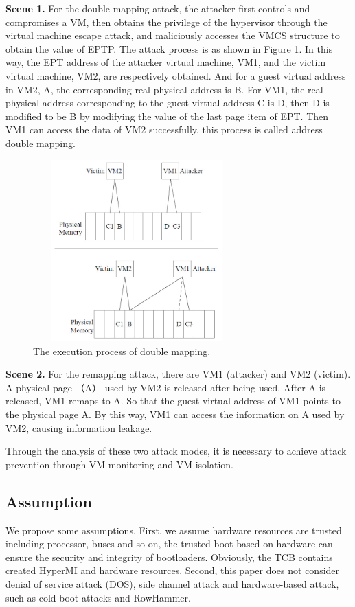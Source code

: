 \documentclass[conference]{IEEEtran}
\begin{document}
\textbf{Scene 1.} 
    For the double mapping attack, the attacker first controls and compromises a VM, then obtains the privilege of the hypervisor through the virtual machine escape attack, and maliciously accesses the VMCS structure to obtain the value of EPTP. The attack process is as shown in Figure \ref{fig0}. In this way, the EPT address of the attacker virtual machine, VM1, and the victim virtual machine, VM2, are respectively obtained. And for a guest virtual address in VM2, A, the corresponding real physical address is B. For VM1, the real physical address corresponding to the guest virtual address C is D, then D is modified to be B by modifying the value of the last page item of EPT. Then VM1 can access the data of VM2 successfully, this process is called address double mapping.

\begin{figure}
\centerline{\includegraphics[width=8cm, height=7cm]{VMCS0.jpg}}%
\caption{The execution process of double mapping. } \label{fig0}
\end{figure}

\textbf{Scene 2.}
    For the remapping attack, there are VM1 (attacker) and VM2 (victim). A physical page （A） used by VM2 is released after being used. After A is released, VM1 remaps to A. So that the guest virtual address of VM1 points to the physical page A. By this way, VM1 can access the information on A used by VM2, causing information leakage.

Through the analysis of these two attack modes, it is necessary to achieve attack prevention through VM monitoring and VM isolation.
\subsection{Assumption}

We propose some assumptions.
First, we assume hardware resources are trusted including processor, buses and so on, the trusted boot based on hardware can ensure the security and integrity of bootloaders. Obviously, the TCB contains created HyperMI and hardware resources. Second, this paper does not consider denial of service attack (DOS), side channel attack and hardware-based attack, such as cold-boot attacks and RowHammer.
\end{document}
